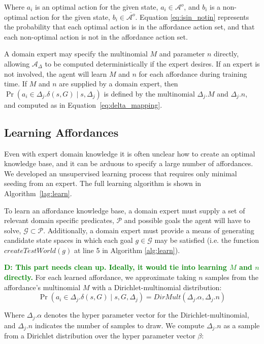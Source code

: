\documentclass[conference]{IEEEtran}
\newcommand{\dnote}[1]{\textcolor{Green}{\textbf{D: #1}}}
\begin{document}
Where $a_i$ is an optimal action for the given state, $a_i \in \mathcal{A}^o$,
and $b_i$ is a non-optimal action for the given state, $b_i \in \overline{\mathcal{A}^o}$.
Equation \ref{eq:isin_notin} represents the probability that each optimal action is in the
affordance action set, and that each non-optimal action is not in the affordance action set.

A domain expert may specify the multinomial $M$ and parameter $n$ directly,
allowing $\mathcal{A_\Delta}$ to be computed deterministically if 
the expert desires. If an expert is not involved, the agent will learn $M$ and
$n$ for each affordance during training time. If $M$ and $n$ are supplied
by a domain expert, then $\Pr(a_i \in \Delta_j.\delta(s,G) \mid s, \Delta_j)$ is
defined by the multinomial $\Delta_j.M$ and $\Delta_j.n$, and computed as in Equation~\ref{eq:delta_mapping}.

\subsection{Learning Affordances}

Even with expert domain knowledge it is often unclear how to create
an optimal knowledge base, and it can be arduous to specify a 
large number of affordances. We developed an unsupervised learning
process that requires only minimal seeding from an expert.
The full learning algorithm is shown in Algorithm~\ref{lag:learn}.

To learn an affordance knowledge base, a domain 
expert must supply a set of relevant domain specific predicates,
$\mathcal{P}$ and possible goals the agent will have to solve, $\mathcal{G}
\subset \mathcal{P}$. Additionally, a domain expert must provide a means 
of generating candidate state spaces in which each goal $g \in \mathcal{G}$
 may be satisfied (i.e. the function $createTestWorld(g)$ at line 5 in Algorithm \ref{alg:learn}).

\dnote{This part needs clean up. Ideally, it would tie into learning $M$ and $n$ directly.}
For each learned affordance, we approximate taking $n$ samples from the affordance's multinomial $M$ with a Dirichlet-multinomial distribution:
\begin{equation}
\Pr(a_i \in \Delta_j.\delta(s,G) \mid s, G, \Delta_j) = DirMult(\Delta_j.\alpha, \Delta_j.n)
\end{equation}

\noindent Where $\Delta_j.\alpha$ denotes the hyper parameter vector
for the Dirichlet-multinomial, and $\Delta_j.n$ indicates the number of
samples to draw. We compute $\Delta_j.n$ as a sample from a Dirichlet
distribution over the hyper parameter vector $\beta$:
\end{document}
